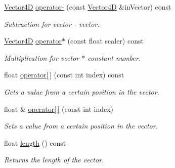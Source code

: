 \begin{DoxyCompactItemize}
\mbox{\label{class_vector4_d_a1a26bc0b5bf66228c14b819bf63f60b2}} 
\mbox{\hyperlink{class_vector4_d}{Vector4D}} \mbox{\hyperlink{class_vector4_d_a1a26bc0b5bf66228c14b819bf63f60b2}{operator-\/}} (const \mbox{\hyperlink{class_vector4_d}{Vector4D}} \&in\+Vector) const
\begin{DoxyCompactList}\small\item\em Subtraction for vector -\/ vector. \end{DoxyCompactList}\item 
\mbox{\label{class_vector4_d_aeda3c6d4456133dde15c5b7cf88496c2}} 
\mbox{\hyperlink{class_vector4_d}{Vector4D}} \mbox{\hyperlink{class_vector4_d_aeda3c6d4456133dde15c5b7cf88496c2}{operator$\ast$}} (const float scaler) const
\begin{DoxyCompactList}\small\item\em Multiplication for vector $\ast$ constant number. \end{DoxyCompactList}\item 
\mbox{\label{class_vector4_d_aa702ee856ea4e3b6f48e7df9d966102d}} 
float \mbox{\hyperlink{class_vector4_d_aa702ee856ea4e3b6f48e7df9d966102d}{operator\mbox{[}$\,$\mbox{]}}} (const int index) const
\begin{DoxyCompactList}\small\item\em Gets a value from a certain position in the vector. \end{DoxyCompactList}\item 
\mbox{\label{class_vector4_d_a019403cfb7ea761983c0548fae5509a7}} 
float \& \mbox{\hyperlink{class_vector4_d_a019403cfb7ea761983c0548fae5509a7}{operator\mbox{[}$\,$\mbox{]}}} (const int index)
\begin{DoxyCompactList}\small\item\em Sets a value from a certain position in the vector. \end{DoxyCompactList}\item 
\mbox{\label{class_vector4_d_ae43dfa6eed13c50019c17b6f324aff0c}} 
float \mbox{\hyperlink{class_vector4_d_ae43dfa6eed13c50019c17b6f324aff0c}{length}} () const
\begin{DoxyCompactList}\small\item\em Returns the length of the vector. \end{DoxyCompactList}\item 

\end{DoxyCompactItemize}
